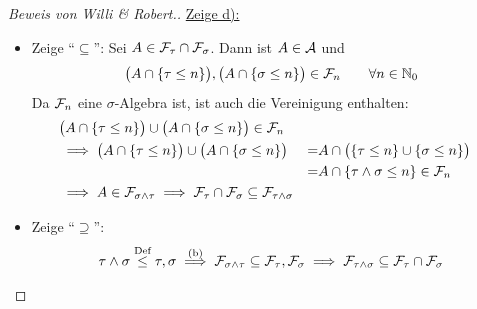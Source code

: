 \documentclass[12pt,a4paper]{article}
\begin{document}
\begin{proof}[Beweis von Willi \& Robert.]
\underline{Zeige d):}\\
\begin{itemize}
\item Zeige ``$\subseteq$'':
Sei $A\in\mathcal{F}_\tau\cap\mathcal{F}_\sigma$. Dann ist $A\in\mathcal{A}$ und
\begin{align*}
\big(A\cap\lbrace\tau\leq n\rbrace\big),\big(A\cap\lbrace\sigma\leq n\rbrace\big)\in\mathcal{F}_n\qquad\forall n\in\mathbb{N}_0
\end{align*}
Da $\mathcal{F}_n$ eine $\sigma$-Algebra ist, ist auch die Vereinigung enthalten:
\begin{align*}
&\big(A\cap\lbrace\tau\leq n\rbrace\big)\cup\big(A\cap\lbrace\sigma\leq n\rbrace\big)\in\mathcal{F}_n\\
&\implies
\big(A\cap\lbrace\tau\leq n\rbrace\big)\cup\big(A\cap\lbrace\sigma\leq n\rbrace\big)
&=&A\cap\big(\lbrace\tau\leq n\rbrace\cup\lbrace\sigma\leq n\rbrace\big)\\
&&=&A\cap\lbrace\tau\wedge\sigma\leq n\rbrace\in\mathcal{F}_n\\
&\implies A\in\mathcal{F}_{\sigma\wedge\tau}\implies \mathcal{F}_\tau\cap\mathcal{F}_\sigma\subseteq\mathcal{F}_{\tau\wedge\sigma}
\end{align*}

\item Zeige ``$\supseteq$'':
\begin{align*}
\tau\wedge\sigma\stackrel{\text{Def}}{\leq}\tau,\sigma\stackrel{\text{(b)}}{\implies}\mathcal{F}_{\sigma\wedge\tau}\subseteq\mathcal{F}_\tau,\mathcal{F}_\sigma\implies\mathcal{F}_{\tau\wedge\sigma}\subseteq\mathcal{F}_\tau\cap\mathcal{F}_\sigma
\end{align*}
\end{itemize}
\end{proof}
\end{document}
